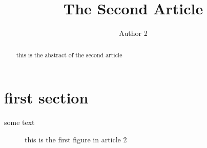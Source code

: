 \documentclass[a4paper]{article}
\title{The Second Article}
\author{Author 2}
\date{}
\begin{document}
	
	\maketitle
	
	\begin{abstract}
		this is the abstract of the second article
	\end{abstract}
	
	\section{first section}
	some text
	
	\begin{figure}
		\caption{this is the first figure in article 2}
	\end{figure}
	
\end{document}
